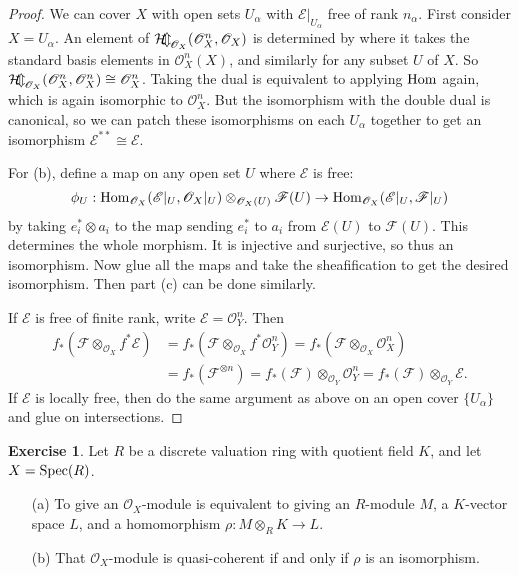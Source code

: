 \documentclass[11pt]{book}
\theoremstyle{definition}
\newtheorem{exercise}{Exercise}[section]
\begin{document}
\begin{proof}
We can cover $X$ with open sets $U_\alpha$ with $\mathscr{E}|_{U_\alpha}$ free of rank $n_\alpha$. First consider $X=U_\alpha$. An element of $\operatorname{\mathcal{H\mkern-7mu o\mkern-2.5mu m\mkern-1.5mu}}_{\mathscr{O}_X}(\mathscr{O}_X^n,\mathscr{O}_X)$ is determined by where it takes the standard basis elements in $\mathscr{O}_X^n(X)$, and similarly
for any subset $U$ of $X$. So $\operatorname{\mathcal{H\mkern-7mu o\mkern-2.5mu m\mkern-1.5mu}}_{\mathscr{O}_X}(\mathscr{O}_X^n,\mathscr{O}_X^n)\cong\mathscr{O}_X^n$. Taking the dual is equivalent to applying $\mathrm{Hom}$ again, which is again isomorphic to $\mathscr{O}_X^n$. But the isomorphism with the double dual is canonical, so we can patch these isomorphisms on each $U_\alpha$ together to get an isomorphism $\mathscr{E}^{**}\cong\mathscr{E}$.\par
For (b), define a map on any open set $U$ where $\mathscr{E}$ is free:
\[\phi_U:\mathrm{Hom}_{\mathscr{O}_X}(\mathscr{E}|_U,\mathscr{O}_X|_U)\otimes_{\mathscr{O}_X(U)}\mathscr{F}(U)\to\mathrm{Hom}_{\mathscr{O}_X}(\mathscr{E}|_U,\mathscr{F}|_U)\]
by taking $e_i^*\otimes a_i$ to the map sending $e_i^*$ to $a_i$ from $\mathscr{E}(U)$ to $\mathscr{F}(U)$. This determines the whole morphism. It is injective and surjective, so thus an isomorphism. Now glue all the maps and take the sheafification to get the desired isomorphism. Then part (c) can be done similarly.\par
If $\mathscr{E}$ is free of finite rank, write $\mathscr{E}=\mathscr{O}_Y^n$. Then
\begin{align*}
f_*(\mathscr{F}\otimes_{\mathscr{O}_X}f^*\mathscr{E})&=f_*(\mathscr{F}\otimes_{\mathscr{O}_X}f^*\mathscr{O}_Y^n)=f_*(\mathscr{F}\otimes_{\mathscr{O}_X}\mathscr{O}_X^n)\\
&=f_*(\mathscr{F}^{\otimes n})=f_*(\mathscr{F})\otimes_{\mathscr{O}_Y}\mathscr{O}_Y^n=f_*(\mathscr{F})\otimes_{\mathscr{O}_Y}\mathscr{E}.
\end{align*}
If $\mathscr{E}$ is locally free, then do the same argument as above on an open cover $\{U_\alpha\}$ and glue on intersections.
\end{proof}
\begin{exercise}
Let $R$ be a discrete valuation ring with quotient field $K$, and let $X=\mathrm{Spec}(R)$.
\begin{itemize}
\item[(a)] To give an $\mathscr{O}_X$-module is equivalent to giving an $R$-module $M$, a $K$-vector space $L$, and a homomorphism $\rho:M\otimes_RK\to L$.
\item[(b)] That $\mathscr{O}_X$-module is quasi-coherent if and only if $\rho$ is an isomorphism.
\end{itemize}
\end{exercise}
\end{document}
